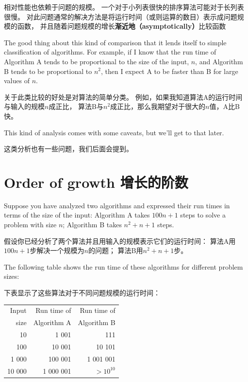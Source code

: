 \documentclass[10pt]{book}
\begin{document}
\begin{CJK}{UTF8}{gbsn}
\begin{itemize}
相对性能也依赖于问题的规模。
一个对于小列表很快的排序算法可能对于长列表很慢。
对此问题通常的解决方法是将运行时间（或则运算的数目）表示成问题规模的函数，
并且随着问题规模的增长{\bf 渐近地（asymptotically）}比较函数

\end{itemize}

The good thing about this kind of comparison that it lends
itself to simple classification of algorithms.  For example,
if I know that the run time of Algorithm A tends to be
proportional to the size of the input, $n$, and Algorithm B
tends to be proportional to $n^2$, then I
expect A to be faster than B for large values of $n$.

关于此类比较的好处是对算法的简单分类。
例如，如果我知道算法A的运行时间与输入的规模$n$成正比，
算法B与$n^2$成正比，那么我期望对于很大的$n$值，A比B快。

This kind of analysis comes with some caveats, but we'll get
to that later.

这类分析也有一些问题，我们后面会提到。

\section{Order of growth 增长的阶数}

Suppose you have analyzed two algorithms and expressed
their run times in terms of the size of the input:
Algorithm A takes $100n+1$ steps to solve a problem with
size $n$; Algorithm B takes $n^2 + n + 1$ steps.

假设你已经分析了两个算法并且用输入的规模表示它们的运行时间：
算法A用$100n+1$步解决一个规模为$n$的问题；
算法B用$n^2 + n + 1$步。

The following table shows the run time of these algorithms
for different problem sizes:

下表显示了这些算法对于不同问题规模的运行时间：

\begin{tabular}{|r|r|r|}
\hline
Input     &   Run time of     & Run time of \\
size      &   Algorithm A     & Algorithm B \\
\hline
10        &   1 001           & 111         \\
100       &   10 001          & 10 101         \\
1 000     &   100 001         & 1 001 001         \\
10 000    &   1 000 001       & $> 10^{10}$         \\
\hline
\end{tabular}


\end{CJK}
\end{document}
